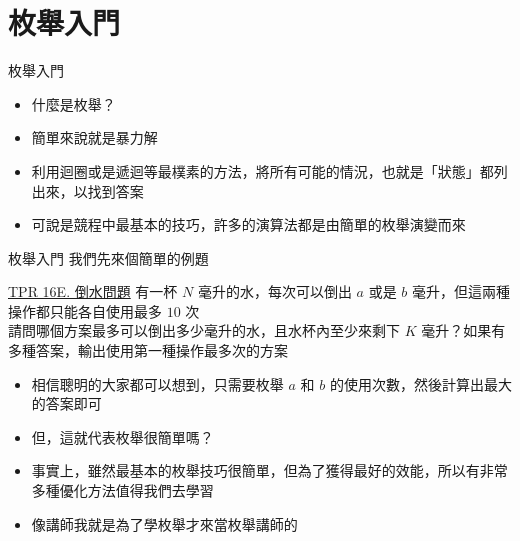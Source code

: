 \documentclass[aspectratio=169]{beamer}
\begin{document}
    \section{枚舉入門}

    \begin{frame}{枚舉入門}
        \begin{itemize}
            \item<1-> 什麼是枚舉？
            \item<2-> 簡單來說就是暴力解
            \item<3-> 利用迴圈或是遞迴等最樸素的方法，將所有可能的情況，也就是「狀態」都列出來，以找到答案
            \item<3-> 可說是競程中最基本的技巧，許多的演算法都是由簡單的枚舉演變而來
        \end{itemize}
    \end{frame}

    \begin{frame}{枚舉入門}
        我們先來個簡單的例題
        \begin{block}{\href{https://codeforces.com/group/H0qY3QmnOW/contest/366708/problem/E}{TPR 16E. 倒水問題}}
            有一杯 $N$ 毫升的水，每次可以倒出 $a$ 或是 $b$ 毫升，但這兩種操作都只能各自使用最多 $10$ 次 \\
            請問哪個方案最多可以倒出多少毫升的水，且水杯內至少來剩下 $K$ 毫升？如果有多種答案，輸出使用第一種操作最多次的方案
        \end{block}

        \begin{itemize}
            \item<1-> 相信聰明的大家都可以想到，只需要枚舉 $a$ 和 $b$ 的使用次數，然後計算出最大的答案即可
            \item<2-> 但，這就代表枚舉很簡單嗎？
            \item<3-> 事實上，雖然最基本的枚舉技巧很簡單，但為了獲得最好的效能，所以有非常多種優化方法值得我們去學習
            \item<4-> 像講師我就是為了學枚舉才來當枚舉講師的
        \end{itemize}
    \end{frame}
\end{document}
